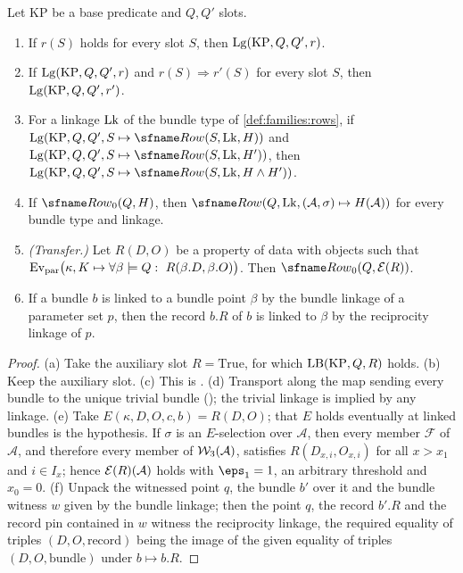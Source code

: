 \begin{lemma}\label{pf:rows:calculus}
Let $\mathrm{KP}$ be a base predicate and $Q,Q'$ slots.
\begin{enumerate}[label=(\alph*)]
\item If $r(S)$ holds for every slot $S$, then $\mathrm{Lg}(\mathrm{KP},Q,Q',r)$.
\item If $\mathrm{Lg}(\mathrm{KP},Q,Q',r)$ and $r(S)\Rightarrow r'(S)$ for every slot $S$, then $\mathrm{Lg}(\mathrm{KP},Q,Q',r')$.
\item For a linkage $\mathrm{Lk}$ of the bundle type of \cref{def:families:rows}, if $\rowsLg(\mathrm{KP},Q,Q',S\mapsto
\rowsRow(S,\rowsLk,H))$ and $\rowsLg(\mathrm{KP},Q,Q',S\mapsto\rowsRow(S,\rowsLk,H'))$, then
$\rowsLg(\mathrm{KP},Q,Q',S\mapsto\rowsRow(S,\rowsLk,H\wedge H'))$.
\item If $\rowsRowZ(Q,H)$, then $\rowsRow(Q,\rowsLk,(\mathcal A,\sigma)\mapsto H(\mathcal A))$ for every bundle type and linkage.
\item \emph{(Transfer.)} Let $R(D,O)$ be a property of data with objects such that
$\mathrm{Ev}_{\mathrm{par}}\bigl(\kappa,K\mapsto\forall\beta\models Q:\ R(\beta.D,\beta.O)\bigr)$. Then $\rowsRowZ(Q,\rowsEvC(R))$.
\item If a bundle $b$ is linked to a bundle point $\beta$ by the bundle linkage of a parameter set $p$, then the record
$b.R$ of $b$ is linked to $\beta$ by the reciprocity linkage of $p$.
\end{enumerate}
\end{lemma}

\begin{proof}
(a) Take the auxiliary slot $R=\mathrm{True}$, for which $\mathrm{LB}(\mathrm{KP},Q,R)$ holds. (b) Keep the auxiliary slot.
(c) This is . (d) Transport along the map sending every bundle to the unique
trivial bundle (); the trivial linkage is implied by any linkage.
(e) Take $E(\kappa,D,O,c,b)=R(D,O)$; that $E$ holds eventually at linked bundles is the hypothesis. If $\sigma$ is an
$E$-selection over $\mathcal A$, then every member $\mathcal F$ of $\mathcal A$, and therefore every member of $\mathcal{W}_3(\mathcal A)$,
satisfies $R(D_{x,i},O_{x,i})$ for all $x>x_1$ and $i\in I_x$; hence $\mathcal{E}(R)(\mathcal A)$ holds with $\eps_1=1$,
an arbitrary threshold and $x_0=0$.
(f) Unpack the witnessed point $q$, the bundle $b'$ over it and the bundle witness $w$ given by the bundle linkage; then
the point $q$, the record $b'.R$ and the record pin contained in $w$ witness the reciprocity linkage, the required equality of triples $(D,O,\text{record})$
being the image of the given equality of triples $(D,O,\text{bundle})$ under $b\mapsto b.R$.
\end{proof}

